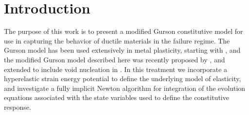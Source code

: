 \chapter{Introduction}
\label{intro}

The purpose of this work is to present a modified Gurson constitutive
model for use in capturing the behavior of ductile materials in the
failure regime. The Gurson model has been used extensively in metal
plasticity, starting with \cite{Gurson1977}, and the modified Gurson
model described here was recently proposed by \cite{Nahshon2008}, and
extended to include void nucleation in \cite{Nahshon2009}. In this
treatment we incorporate a hyperelastic strain energy potential to
define the underlying model of elasticity, and investigate a fully
implicit Newton algorithm for integration of the evolution equations
associated with the state variables used to define the constitutive
response.

